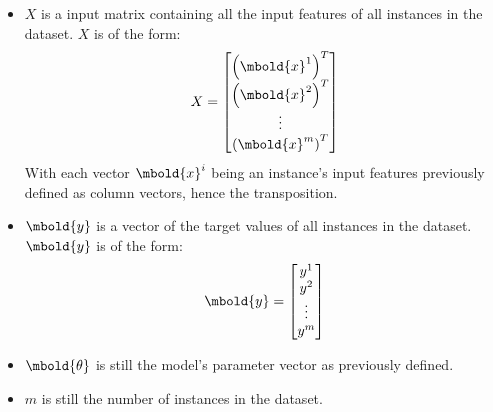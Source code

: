 \documentclass[12pt letter]{report}
\begin{document}
\begin{itemize}
  \item $X$ is a input matrix containing all the input features of all instances in the dataset. $X$ is of the form:
        \[
          X = \begin{bmatrix}
            \left( \mbold{x}^{1} \right)^{T} \\
            \left( \mbold{x}^{2} \right)^{T} \\
            \vdots                           \\
            \left( \mbold{x}^{m} \right)^{T} \\
          \end{bmatrix}
        \]
        With each vector $\mbold{x}^{i}$ being an instance's input features previously defined as column vectors, hence
        the transposition.
  \item $\mbold{y}$ is a vector of the target values of all instances in the dataset. $\mbold{y}$ is of the form:
        \[
          \mbold{y} = \begin{bmatrix}
            y^{1}  \\
            y^{2}  \\
            \vdots \\
            y^{m}
          \end{bmatrix}
        \]
  \item $\mbold{\theta}$ is still the model's parameter vector as previously defined.
  \item $m$ is still the number of instances in the dataset.
\end{itemize}
\end{document}
